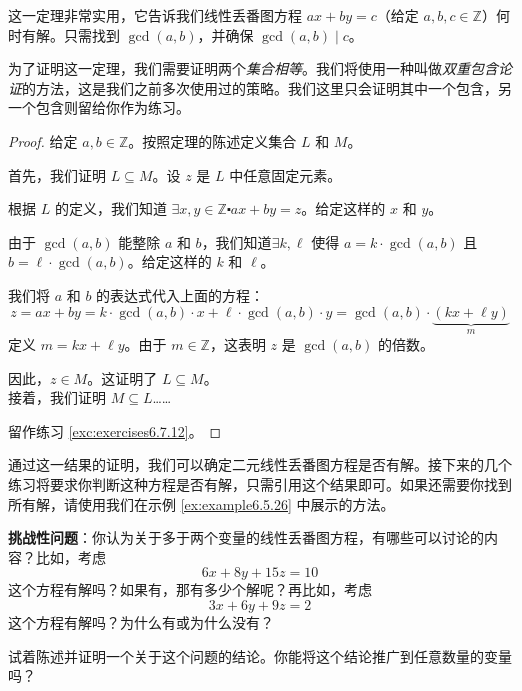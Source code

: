 这一定理非常实用，它告诉我们线性丢番图方程 $ax + by = c$（给定 $a, b, c \in \mathbb{Z}$）何时有解。只需找到 $\gcd(a, b)$，并确保 $\gcd(a, b) \mid c$。

为了证明这一定理，我们需要证明两个\emph{集合相等}。我们将使用一种叫做\emph{双重包含论证}的方法，这是我们之前多次使用过的策略。我们这里只会证明其中一个包含，另一个包含则留给你作为练习。

\begin{proof}
    给定 $a, b \in \mathbb{Z}$。按照定理的陈述定义集合 $L$ 和 $M$。

    首先，我们证明 $L \subseteq M$。设 $z$ 是 $L$ 中任意固定元素。

    根据 $L$ 的定义，我们知道 $\exists x, y \in \mathbb{Z} \centerdot ax + by = z$。给定这样的 $x$ 和 $y$。

    由于 $\gcd(a, b)$ 能整除 $a$ 和 $b$，我们知道$\exists k, \ell$ 使得 $a = k \cdot \gcd(a, b)$ 且 $b = \ell  \cdot \gcd(a, b)$。给定这样的 $k$ 和 $\ell$。

    我们将 $a$ 和 $b$ 的表达式代入上面的方程：
    \[z = ax + by = k \cdot \gcd(a, b) \cdot x + \ell \cdot \gcd(a, b) \cdot y = \gcd(a, b) \cdot \underbrace{(kx + \ell y)}_{m}\]
    定义 $m = kx + \ell y$。由于 $m \in \mathbb{Z}$，这表明 $z$ 是 $\gcd(a, b)$ 的倍数。

    因此，$z \in M$。这证明了 $L \subseteq M$。\\

    接着，我们证明 $M \subseteq L$……

    留作练习 \ref{exc:exercises6.7.12}。
\end{proof}

通过这一结果的证明，我们可以确定二元线性丢番图方程是否有解。接下来的几个练习将要求你判断这种方程是否有解，只需引用这个结果即可。如果还需要你找到所有解，请使用我们在示例 \ref{ex:example6.5.26} 中展示的方法。

\textbf{挑战性问题}：你认为关于多于两个变量的线性丢番图方程，有哪些可以讨论的内容？比如，考虑
\[6x + 8y + 15z = 10\]
这个方程有解吗？如果有，那有多少个解呢？再比如，考虑
\[3x + 6y + 9z = 2\]
这个方程有解吗？为什么有或为什么没有？

试着陈述并证明一个关于这个问题的结论。你能将这个结论推广到任意数量的变量吗？
